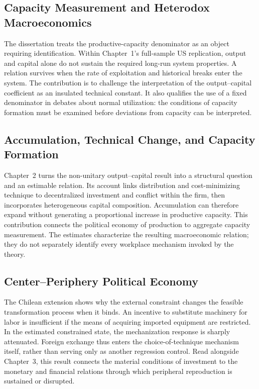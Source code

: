 \subsection*{Capacity Measurement and Heterodox Macroeconomics}

The dissertation treats the productive-capacity denominator as an object requiring identification. Within Chapter~1's full-sample US replication, output and capital alone do not sustain the required long-run system properties. A relation survives when the rate of exploitation and historical breaks enter the system. The contribution is to challenge the interpretation of the output--capital coefficient as an insulated technical constant. It also qualifies the use of a fixed denominator in debates about normal utilization: the conditions of capacity formation must be examined before deviations from capacity can be interpreted.

\subsection*{Accumulation, Technical Change, and Capacity Formation}

Chapter~2 turns the non-unitary output--capital result into a structural question and an estimable relation. Its account links distribution and cost-minimizing technique to decentralized investment and conflict within the firm, then incorporates heterogeneous capital composition. Accumulation can therefore expand without generating a proportional increase in productive capacity. This contribution connects the political economy of production to aggregate capacity measurement. The estimates characterize the resulting macroeconomic relation; they do not separately identify every workplace mechanism invoked by the theory.

\subsection*{Center--Periphery Political Economy}

The Chilean extension shows why the external constraint changes the feasible transformation process when it binds. An incentive to substitute machinery for labor is insufficient if the means of acquiring imported equipment are restricted. In the estimated constrained state, the mechanization response is sharply attenuated. Foreign exchange thus enters the choice-of-technique mechanism itself, rather than serving only as another regression control. Read alongside Chapter~3, this result connects the material conditions of investment to the monetary and financial relations through which peripheral reproduction is sustained or disrupted.

